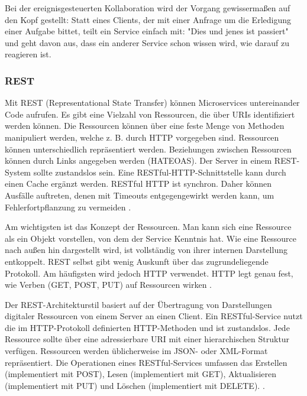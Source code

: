 {Bei der ereignisgesteuerten Kollaboration wird der Vorgang gewissermaßen auf den Kopf gestellt: Statt eines Clients, der mit einer Anfrage um die Erledigung einer Aufgabe bittet, teilt ein Service einfach mit: "Dies und jenes ist passiert" und geht davon aus, dass ein anderer Service schon wissen wird, wie darauf zu reagieren ist.
\cite[S.70-71]{newman}

\subsubsection{REST}


Mit REST (Representational State Transfer) können Microservices untereinander Code aufrufen. Es gibt eine Vielzahl von Ressourcen, die über URIs identifiziert werden können. Die Ressourcen können über eine feste Menge von Methoden manipuliert werden, welche z. B. durch HTTP vorgegeben sind. Ressourcen können unterschiedlich repräsentiert werden. Beziehungen zwischen Ressourcen können durch Links angegeben werden (HATEOAS). Der Server in einem REST-System sollte zustandslos sein. Eine RESTful-HTTP-Schnittstelle kann durch einen Cache ergänzt werden. RESTful HTTP ist synchron. Daher können Ausfälle auftreten, denen mit Timeouts entgegengewirkt werden kann, um Fehlerfortpflanzung zu vermeiden \cite[S. 182 - 183]{wolff}.

Am wichtigsten ist das Konzept der Ressourcen. Man kann sich eine Ressource als ein Objekt vorstellen, von dem der Service Kenntnis hat. Wie eine Ressource nach außen hin dargestellt wird, ist vollständig von ihrer internen Darstellung entkoppelt. REST selbst gibt wenig Auskunft über das zugrundeliegende Protokoll. Am häufigsten wird jedoch HTTP verwendet. HTTP legt genau fest, wie Verben (GET, POST, PUT) auf Ressourcen wirken \cite[S.79-80]{newman}.

Der REST-Architekturstil basiert auf der Übertragung von Darstellungen digitaler Ressourcen von einem Server an einen Client. Ein RESTful-Service nutzt die im HTTP-Protokoll definierten HTTP-Methoden und ist zustandslos. Jede Ressource sollte über eine adressierbare URI mit einer hierarchischen Struktur verfügen. Ressourcen werden üblicherweise im JSON- oder XML-Format repräsentiert. Die Operationen eines RESTful-Services umfassen das Erstellen (implementiert mit POST), Lesen (implementiert mit GET), Aktualisieren (implementiert mit PUT) und Löschen (implementiert mit DELETE). \cite[S.173-175]{sommerville}.

}
